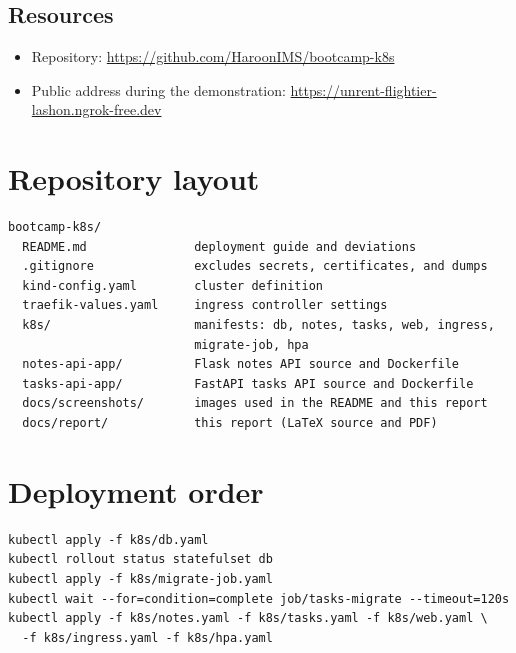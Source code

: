 \documentclass[11pt,a4paper]{article}
\begin{document}
\subsection*{Resources}
\begin{itemize}[leftmargin=*]
  \item Repository: \url{https://github.com/HaroonIMS/bootcamp-k8s}
  \item Public address during the demonstration: \url{https://unrent-flightier-lashon.ngrok-free.dev}
\end{itemize}

\appendix
\section{Repository layout}
\begin{lstlisting}
bootcamp-k8s/
  README.md               deployment guide and deviations
  .gitignore              excludes secrets, certificates, and dumps
  kind-config.yaml        cluster definition
  traefik-values.yaml     ingress controller settings
  k8s/                    manifests: db, notes, tasks, web, ingress,
                          migrate-job, hpa
  notes-api-app/          Flask notes API source and Dockerfile
  tasks-api-app/          FastAPI tasks API source and Dockerfile
  docs/screenshots/       images used in the README and this report
  docs/report/            this report (LaTeX source and PDF)
\end{lstlisting}

\section{Deployment order}
\begin{lstlisting}
kubectl apply -f k8s/db.yaml
kubectl rollout status statefulset db
kubectl apply -f k8s/migrate-job.yaml
kubectl wait --for=condition=complete job/tasks-migrate --timeout=120s
kubectl apply -f k8s/notes.yaml -f k8s/tasks.yaml -f k8s/web.yaml \
  -f k8s/ingress.yaml -f k8s/hpa.yaml
\end{lstlisting}
\end{document}
